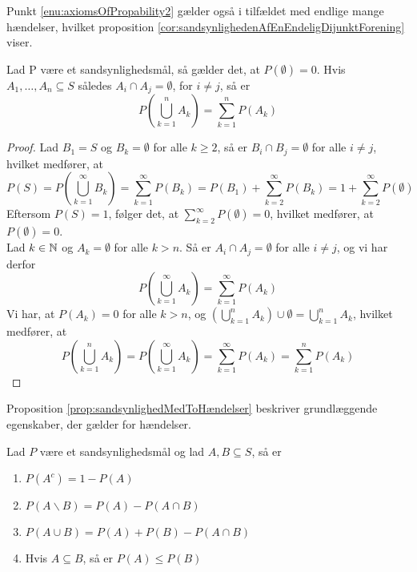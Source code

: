 Punkt \ref{enu:axiomsOfPropability2} gælder også i tilfældet med endlige mange hændelser, hvilket proposition \ref{cor:sandsynlighedenAfEnEndeligDijunktForening} viser. 

\begin{prop} \label{cor:sandsynlighedenAfEnEndeligDijunktForening} %
Lad P være et sandsynlighedsmål, så gælder det, at $P(\emptyset) = 0$. Hvis $A_1, \ldots , A_n \subseteq S$ således $A_i\cap A_j=\emptyset$, for $i \neq j$, så er
\begin{equation*}
    P\left(\bigcup^n_{k = 1} A_k\right) = \sum^n_{k = 1} P(A_k)
\end{equation*}
\end{prop}
\begin{proof}
Lad $B_1 = S$ og $B_k = \emptyset$ for alle $k \geq 2$, så er $B_i \cap B_j = \emptyset$ for alle $i \neq j$, hvilket medfører, at \begin{equation*}
    P(S) = P\left(\bigcup^\infty_{k = 1} B_k\right) = \sum^\infty_{k = 1} P(B_k) = P(B_1) + \sum^\infty_{k = 2} P(B_k) = 1 + \sum^\infty_{k = 2} P(\emptyset) 
\end{equation*}
Eftersom $P(S) = 1$, følger det, at $\sum^\infty_{k = 2} P(\emptyset) = 0$, hvilket medfører, at $P(\emptyset) = 0$. \\
Lad $k\in \mathbb{N}$ og $A_k = \emptyset$ for alle $k > n$. Så er $A_i \cap A_j = \emptyset$ for alle $i \neq j$, og vi har derfor 
\begin{equation*}
    P\left(\bigcup_{k=1}^\infty A_k\right)=\sum_{k=1}^\infty P(A_k)
\end{equation*}
Vi har, at $P(A_k) = 0$ for alle $k > n$, og $\displaystyle\left(\bigcup^n_{k = 1} A_k\right) \cup \emptyset = \bigcup^n_{k = 1} A_k$, hvilket medfører, at
\begin{equation*}
   P\left(\bigcup_{k=1}^n A_k\right) = P\left(\bigcup_{k=1}^\infty A_k\right) = \sum_{k=1}^\infty P(A_k) = \sum_{k=1}^n P(A_k)
\end{equation*}
\end{proof} 
Proposition \ref{prop:sandsynlighedMedToHændelser} beskriver grundlæggende egenskaber, der gælder for hændelser. 
\begin{prop} \label{prop:sandsynlighedMedToHændelser} %
Lad $P$ være et sandsynlighedsmål og lad $A, B \subseteq S$, så er 
\begin{enumerate}
    \item $P(A^c) = 1 - P(A)$ \label{enu:propsandsynlighedMedToHændelser1}
    \item $P(A\backslash B) = P(A) - P(A \cap B)$ 
    \item $P(A \cup B) = P(A) + P(B) - P(A \cap B)$ 
    \item Hvis $A \subseteq B$, så er $P(A) \leq P(B)$
\end{enumerate}
\end{prop}
